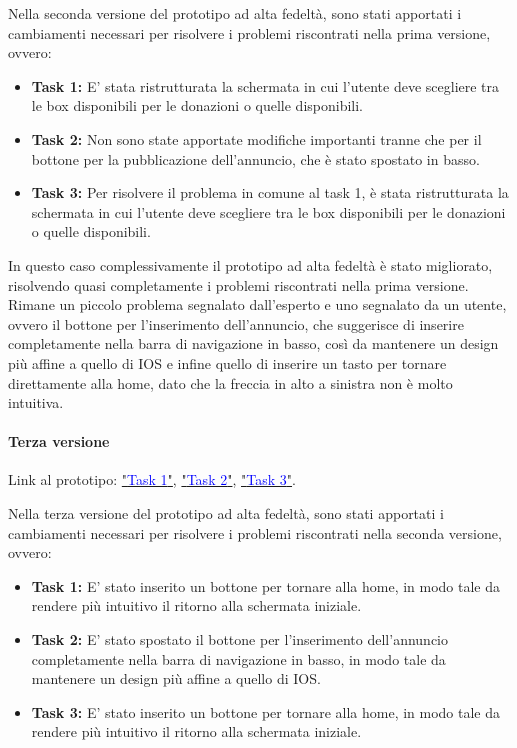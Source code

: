 \documentclass{article}
\begin{document}
Nella seconda versione del prototipo ad alta fedeltà, sono stati apportati i cambiamenti necessari per risolvere i problemi riscontrati nella prima versione, ovvero:
\begin{itemize}
    \item \textbf{Task 1:} E' stata ristrutturata la schermata in cui l'utente deve scegliere tra le box disponibili per le donazioni o quelle disponibili.
    \item \textbf{Task 2:} Non sono state apportate modifiche importanti tranne che per il bottone per la pubblicazione dell'annuncio, che è stato spostato in basso.
    \item \textbf{Task 3:} Per risolvere il problema in comune al task 1, è stata ristrutturata la schermata in cui l'utente deve scegliere tra le box disponibili per le donazioni o quelle disponibili.
\end{itemize}

In questo caso complessivamente il prototipo ad alta fedeltà è stato migliorato, risolvendo quasi completamente i problemi riscontrati nella prima versione.
Rimane un piccolo problema segnalato dall'esperto e uno segnalato da un utente, ovvero il bottone per l'inserimento dell'annuncio, che suggerisce di inserire completamente nella barra di navigazione in basso, così da mantenere un design più affine a quello di IOS e infine quello di inserire un tasto per tornare direttamente alla home, dato che la freccia in alto a sinistra non è molto intuitiva.

\paragraph{Terza versione}
\mbox{}
\newline
Link al prototipo: \href{https://www.figma.com/proto/xET26iTanAxBERu0jhT0FS/Task?node-id=0-1&t=yNOGB0vveNBLslKN-1}{"\textcolor{blue}{Task 1}"}, \href{https://www.figma.com/design/xET26iTanAxBERu0jhT0FS/Task?node-id=31-38&t=yNOGB0vveNBLslKN-1}{"\textcolor{blue}{Task 2}"}, \href{https://www.figma.com/proto/xET26iTanAxBERu0jhT0FS/Task?node-id=74-42&t=yNOGB0vveNBLslKN-1}{"\textcolor{blue}{Task 3}"}.

Nella terza versione del prototipo ad alta fedeltà, sono stati apportati i cambiamenti necessari per risolvere i problemi riscontrati nella seconda versione, ovvero:
\begin{itemize}
    \item \textbf{Task 1:} E' stato inserito un bottone per tornare alla home, in modo tale da rendere più intuitivo il ritorno alla schermata iniziale.
    \item \textbf{Task 2:} E' stato spostato il bottone per l'inserimento dell'annuncio completamente nella barra di navigazione in basso, in modo tale da mantenere un design più affine a quello di IOS.
    \item \textbf{Task 3:} E' stato inserito un bottone per tornare alla home, in modo tale da rendere più intuitivo il ritorno alla schermata iniziale.
\end{itemize}
\end{document}
